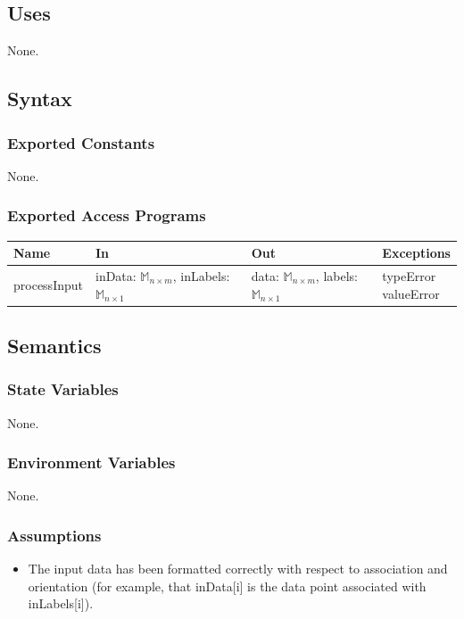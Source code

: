 \documentclass[12pt, titlepage]{article}
\begin{document}
\subsection{Uses}
None.

\subsection{Syntax}

\subsubsection{Exported Constants}
None.

\subsubsection{Exported Access Programs}

\begin{center}
\begin{tabular}{p{3cm} p{3cm} p{4cm} p{2cm}}
\hline
\textbf{Name} & \textbf{In} & \textbf{Out} & \textbf{Exceptions} \\
\hline
processInput & \makecell[1]{inData: $\mathbb{M}_{n \times m}$, \\ inLabels: $\mathbb{M}_{n \times 1}$} & \makecell[1]{data: $\mathbb{M}_{n \times m}$, \\ labels: $\mathbb{M}_{n \times 1}$} & \makecell[1]{typeError \\ valueError} \\
\hline
\end{tabular}
\end{center}

\subsection{Semantics}

\subsubsection{State Variables}
None.

\subsubsection{Environment Variables}
None.

\subsubsection{Assumptions}
\begin{itemize}
\item The input data has been formatted correctly with respect to association and orientation (for example, that inData[i] is the data point associated with inLabels[i]).
\end{itemize}
\end{document}
